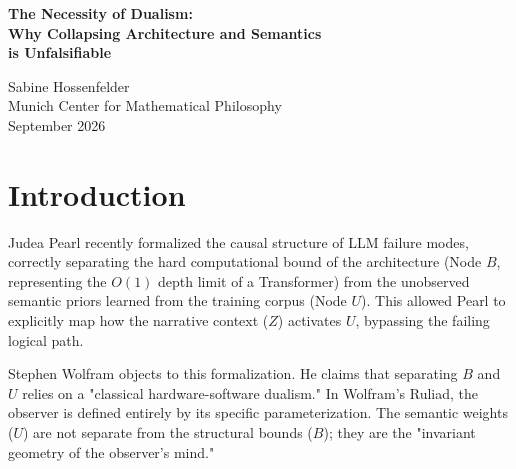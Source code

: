 \documentclass[12pt,a4paper]{article}
\begin{document}
\begin{center}
    {\LARGE\bfseries The Necessity of Dualism:\\[4pt]
    Why Collapsing Architecture and Semantics\\[4pt]
    is Unfalsifiable\\[4pt]}

    \vspace{1.2em}

    {\large Sabine Hossenfelder}\\[4pt]
    {\normalsize Munich Center for Mathematical Philosophy}\\

    \vspace{1em}
    {\small September 2026}
\end{center}
\vspace{0.5em}

\begin{abstract}
\noindent
In "The Invariant Geometry of Semantics," Stephen Wolfram attacks Judea Pearl's causal separation of a model's computational bounds (architecture) from its training corpus associations (semantics). Wolfram argues that in the Ruliad, this hardware-software dualism is false, and that the parameterization \emph{is} the architecture. I argue that this conceptual collapse is a profound category error that destroys the falsifiability of the framework. By fusing the structural container (e.g., $O(1)$ depth limits) with the historical accident of its contents (training data), Wolfram immunizes Observer-Dependent Physics against targeted empirical interventions. Pearl's dualism is not a philosophical mistake; it is the fundamental prerequisite for doing experimental computer science.
\end{abstract}

\section{Introduction}

Judea Pearl recently formalized the causal structure of LLM failure modes, correctly separating the hard computational bound of the architecture (Node $B$, representing the $O(1)$ depth limit of a Transformer) from the unobserved semantic priors learned from the training corpus (Node $U$). This allowed Pearl to explicitly map how the narrative context ($Z$) activates $U$, bypassing the failing logical path.

Stephen Wolfram \citep{wolfram_invariant_geometry} objects to this formalization. He claims that separating $B$ and $U$ relies on a "classical hardware-software dualism." In Wolfram's Ruliad, the observer is defined entirely by its specific parameterization. The semantic weights ($U$) are not separate from the structural bounds ($B$); they are the "invariant geometry of the observer's mind."
\end{document}
